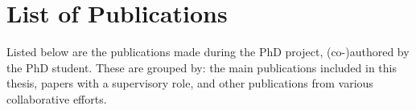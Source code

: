 \chapter*{List of Publications}\label{ch:listOfPublications}
Listed below are the publications made during the PhD project, (co-)authored by the PhD student. These are grouped by: the main publications included in this thesis, papers with a supervisory role, and other publications from various collaborative efforts.
{
\makeatletter
\renewenvironment{thebibliography}[1]
     {\subsubsection*{\bibname}%
      \@mkboth{\MakeUppercase\bibname}{\MakeUppercase\bibname}%
      \list{\@biblabel{\@Alph\c@enumiv}}%
           {\settowidth\labelwidth{\@biblabel{\@Alph#1}}%
            \leftmargin\labelwidth
            \advance\leftmargin\labelsep
            \@openbib@code
            \usecounter{enumiv}%
            \let\p@enumiv\@empty
            \renewcommand\theenumiv{\@Alph\c@enumiv}}%
      \sloppy
      \clubpenalty4000
      \@clubpenalty \clubpenalty
      \widowpenalty4000%
      \sfcode`\.\@m}
     {\def\@noitemerr
       {\@latex@warning{Empty `thebibliography' environment}}%
      \endlist}
\makeatother


\makeatletter
\renewenvironment{thebibliography}[1]
     {\subsubsection*{\bibname}%
      \@mkboth{\MakeUppercase\bibname}{\MakeUppercase\bibname}%
      \list{\@biblabel{S\@arabic\c@enumiv}}%
           {\settowidth\labelwidth{\@biblabel{S#1}}%
            \leftmargin\labelwidth
            \advance\leftmargin\labelsep
            \@openbib@code
            \usecounter{enumiv}%
            \let\p@enumiv\@empty
            \renewcommand\theenumiv{S\@arabic\c@enumiv}}%
      \sloppy
      \clubpenalty4000
      \@clubpenalty \clubpenalty
      \widowpenalty4000%
      \sfcode`\.\@m}
     {\def\@noitemerr
       {\@latex@warning{Empty `thebibliography' environment}}%
      \endlist}
\makeatother


}
